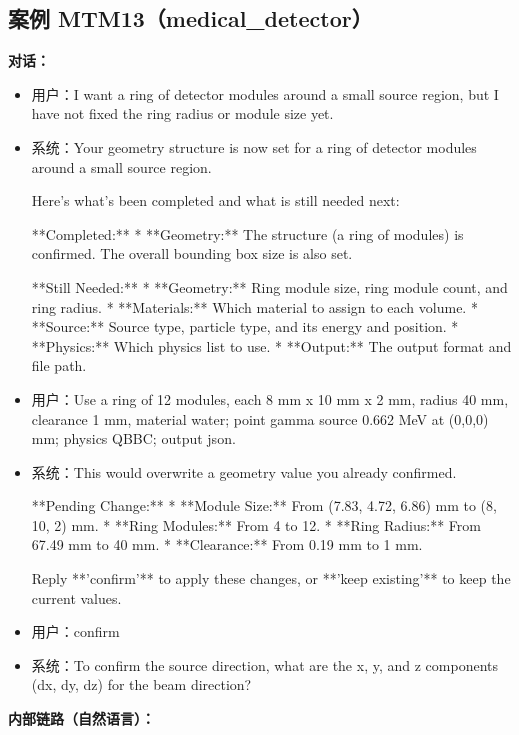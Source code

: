 \documentclass[11pt]{ctexart}
\begin{document}
\subsection{案例 MTM13（medical\_detector）}
\textbf{对话：}
\begin{itemize}
\item 用户：I want a ring of detector modules around a small source region, but I have not fixed the ring radius or module size yet.
\item 系统：Your geometry structure is now set for a ring of detector modules around a small source region.

Here’s what’s been completed and what is still needed next:

**Completed:**
*   **Geometry:** The structure (a ring of modules) is confirmed. The overall bounding box size is also set.

**Still Needed:**
*   **Geometry:** Ring module size, ring module count, and ring radius.
*   **Materials:** Which material to assign to each volume.
*   **Source:** Source type, particle type, and its energy and position.
*   **Physics:** Which physics list to use.
*   **Output:** The output format and file path.
\item 用户：Use a ring of 12 modules, each 8 mm x 10 mm x 2 mm, radius 40 mm, clearance 1 mm, material water; point gamma source 0.662 MeV at (0,0,0) mm; physics QBBC; output json.
\item 系统：This would overwrite a geometry value you already confirmed.

**Pending Change:**
*   **Module Size:** From (7.83, 4.72, 6.86) mm to (8, 10, 2) mm.
*   **Ring Modules:** From 4 to 12.
*   **Ring Radius:** From 67.49 mm to 40 mm.
*   **Clearance:** From 0.19 mm to 1 mm.

Reply **'confirm'** to apply these changes, or **'keep existing'** to keep the current values.
\item 用户：confirm
\item 系统：To confirm the source direction, what are the x, y, and z components (dx, dy, dz) for the beam direction?
\end{itemize}
\textbf{内部链路（自然语言）：}
\end{document}
